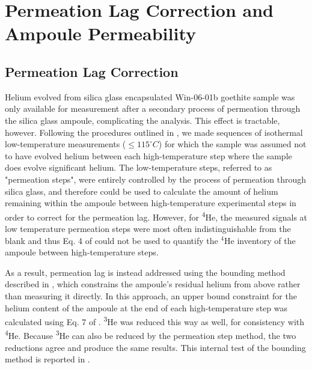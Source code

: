 
\section{Permeation Lag Correction and Ampoule Permeability}\label{sec:ch2-si-permeation}

\subsection{Permeation Lag Correction}\label{permeation-lag-correction}

Helium evolved from silica glass encapsulated Win-06-01b goethite sample was only available for 
measurement after a secondary process of permeation through the silica glass ampoule, complicating the analysis. This
effect is tractable, however. Following the procedures outlined in \citet{thyer2026method}, 
we made sequences of isothermal low-temperature measurements ($\leq115^{\circ}C$) for which the sample
was assumed not to have evolved helium between each high-temperature step where the sample 
does evolve significant helium. The low-temperature steps, referred to as "permeation steps", were entirely
controlled by the process of permeation through silica glass, and
therefore could be used to calculate the amount of helium remaining within the
ampoule between high-temperature experimental steps in order to correct for the permeation lag. 
However, for \textsuperscript{4}He, the measured signals at low temperature permeation steps were most often
indistinguishable from the blank and thus Eq. 4 of \citet{thyer2026method} could not be used to quantify the
$^4$He inventory of the ampoule between high-temperature steps. 

As a result, permeation lag is instead addressed using the bounding method described in \citet{thyer2026method}, 
which constrains the ampoule's residual helium from above rather than measuring it directly.
In this approach, an upper bound constraint for the helium content of the ampoule 
at the end of each high-temperature step was
calculated using Eq. 7 of \citet{thyer2026method}. \textsuperscript{3}He was reduced this way as well, 
for consistency with \textsuperscript{4}He. Because \textsuperscript{3}He can also be reduced by the 
permeation step method, the two reductions agree and produce the same results. This internal test 
of the bounding method is reported in \citet{thyer2026thesis}.


